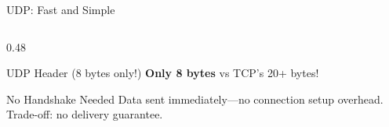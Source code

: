 \documentclass[aspectratio=169]{beamer}  %
\begin{document}
\begin{frame}{UDP: Fast and Simple}
\begin{columns}[T]
\begin{column}{0.48\textwidth}
\begin{block}{UDP Header (8 bytes only!)}
                \vspace{0.2em}
                \footnotesize
                \textcolor{udpgreen}{\textbf{Only 8 bytes}} vs TCP's 20+ bytes!
            \end{block}
            
            \vspace{0.3em}
            \begin{alertblock}{No Handshake Needed}
                \small
                Data sent immediately---no connection setup overhead. Trade-off: no delivery guarantee.
            \end{alertblock}
        \end{column}
    \end{columns}
\end{frame}

\end{document}
